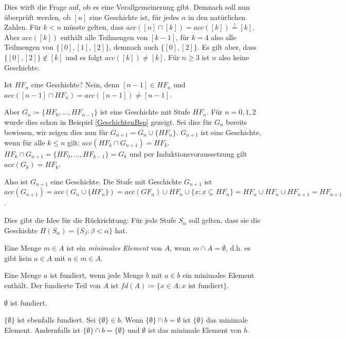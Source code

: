 Dies wirft die Frage auf, ob es eine Verallgemeinerung gibt. Demnach soll nun überprüft werden, ob $[n]$ eine Geschichte ist, für jedes $n$ in den natürlichen Zahlen. Für $k<n$ müsste gelten, dass $acc([n]\cap[k])=acc([k])\stackrel{!}{=}[k]$. 
Aber $acc([k])$ enthält alle Teilmengen von $[k-1]$, für $k=4$ also alle Teilmengen von $\{[0],[1],[2]\}$, demnach auch $\{[0], [2]\}$. Es gilt aber, dass $\{[0],[2]\}\notin [k]$ und es folgt $acc([k])\neq[k]$. Für $n \geq 3$ ist $n$ also keine Geschichte.

Ist $HF_n$ eine Geschichte? Nein, denn $[n-1]\in HF_n$ und $acc([n-1]\cap HF_n)=acc([n-1])\neq[n-1]$.

Aber $G_n\coloneqq\{HF_0,\dots,HF_{n-1}\}$ ist eine Geschichte mit Stufe $HF_n$. Für $n=0,1,2$ wurde dies schon in Beispiel \ref{GeschichtenBsp} gezeigt. Sei dies für $G_n$ bereits bewiesen, wir zeigen dies nun für $G_{n+1}=G_n\cup\{HF_n\}$.
$G_{n+1}$ ist eine Geschichte, wenn für alle $k \leq n$ gilt: $acc(HF_k\cap G_{n+1})=HF_k$.
$HF_k \cap G_{n+1} = \{HF_0,\dots,HF_{k-1}\}=G_k$ und per Induktionsvoraussetzung gilt $acc(G_k)=HF_k$.

Also ist $G_{n+1}$ eine Geschichte. Die Stufe mit Geschichte $G_{n+1}$ ist $acc(G_{n+1})=acc(G_n\cup \{HF_n\})=acc(GF_n)\cup HF_n \cup \{x : x\subseteq HF_n\}=HF_n\cup HF_n \cup HF_{n+1} = HF_{n+1}$.

Dies gibt die Idee für die Rückrichtung: Für jede Stufe $S_\alpha$ soll gelten, dass sie die Geschichte $H(S_\alpha)=\{S_\beta : \beta < \alpha\}$ hat.

\begin{definition}
	Eine Menge $m\in A$ ist ein \textit{minimales Element} von $A$, wenn $m\cap A=\emptyset$, d.h. es gibt kein $a\in A$ mit $a\in m \in A$.
	
	Eine Menge $a$ ist fundiert, wenn jede Menge $b$ mit $a\in b$ ein minimales Element enthält. Der fundierte Teil von $A$ ist $fd(A)\coloneqq\{x\in A : x \text{ ist fundiert}\}$.
\end{definition}

\begin{example}
	$\emptyset$ ist fundiert.
	
	$\{\emptyset\}$ ist ebenfalls fundiert. Sei $\{\emptyset\}\in b$. Wenn $\{\emptyset\}\cap b =\emptyset$ ist $\{\emptyset\}$ das minimale Element. Andernfalls ist $\{\emptyset\}\cap b=\{\emptyset\}$ und $\emptyset$ ist das minimale Element von $b$.
\end{example}


